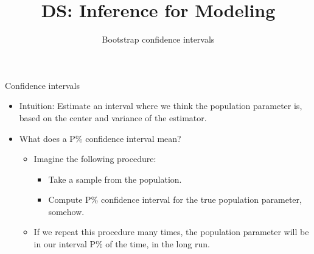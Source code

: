 \documentclass[aspectratio=169]{../latex_main/tntbeamer}  %
\title[Introduction]{DS: Inference for Modeling}
\subtitle{Bootstrap confidence intervals}
\begin{document}
	
	\maketitle
	\begin{frame}{Confidence intervals}
	    \begin{itemize}
	        \item Intuition: Estimate an interval where we think the population parameter is, based on the center and variance of the estimator.
	        \item What does a P\% confidence interval mean?
	        \begin{itemize}
	            \item Imagine the following procedure:
	            \begin{itemize}
	                \item Take a sample from the population.
	                \item Compute P\% confidence interval for the true population parameter, somehow.
	            \end{itemize}
	            \item If we repeat this procedure many times, the population parameter will be in our interval P\% of the time, in the long run.
	        \end{itemize}
	    \end{itemize}
	\end{frame}
	
\end{document}
